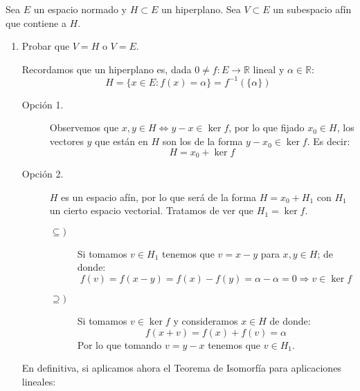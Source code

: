 \begin{ejercicio} %
    Sea $E$ un espacio normado y $H\subset E$ un hiperplano. Sea $V\subset E$ un subespacio afín que contiene a $H$.
    \begin{enumerate}[label=\alph*)]
        \item Probar que $V=H$ o $V=E$.

            Recordamos que un hiperplano es, dada $0\neq f:E\to \mathbb{R}$ lineal y $\alpha\in \mathbb{R}$:
            \begin{equation*}
                H = \{x\in E : f(x)=\alpha\} = f^{-1}(\{\alpha\})
            \end{equation*}
            \begin{description}
                \item [Opción 1.] Observemos que $x,y\in H\Longleftrightarrow  y-x\in \ker f$, por lo que fijado $x_0\in H$, los vectores $y$ que están en $H$ son los de la forma $y-x_0\in \ker f$. Es decir:
                    \begin{equation*}
                        H = x_0 + \ker f
                    \end{equation*}
                \item [Opción 2.] $H$ es un espacio afín, por lo que será de la forma $H = x_0 + H_1$ con $H_1$ un cierto espacio vectorial. Tratamos de ver que $H_1 = \ker f$. 
                    \begin{description}
                        \item [$\subseteq )$] Si tomamos $v\in H_1$ tenemos que $v = x-y$ para $x,y\in H$; de donde:
                            \begin{equation*}
                                f(v) = f(x-y) = f(x) - f(y) = \alpha - \alpha = 0  \Longrightarrow v\in \ker f
                            \end{equation*}
                        \item [$\supseteq )$] Si tomamos $v\in \ker f$ y consideramos $x\in H$ de donde:
                            \begin{equation*}
                                f(x+v) = f(x) + f(v) = \alpha
                            \end{equation*}
                            Por lo que tomando $v=y-x$ tenemos que $v\in H_1$.
                    \end{description}
            \end{description}
            En definitiva, si aplicamos ahora el Teorema de Isomorfía para aplicaciones lineales:

\end{enumerate}
\end{ejercicio}
